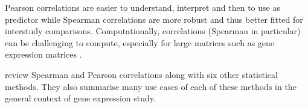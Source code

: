 Pearson correlations are easier to understand, interpret and then to use as predictor
while Spearman correlations are more robust and thus better fitted for interstudy
comparisons.
Computationally, correlations (Spearman in particular) can be challenging to compute,
especially for large matrices such as gene expression matrices .

\begin{comment}
Spearman correlations report on the strength and direction
of a monotonic relationship (specifically for ordinal data i.e.\ ranks)
between two variables.
It can also be used on interval or ratio data
even though Pearson correlation are usually better fitted to these kinds of data.
Pearson correlation measure the linear relationship between two variables
(interval scale) (true value).
\end{comment}

\cite{De_Siqueira_Santos2014-dp} review Spearman and Pearson correlations
along with six other statistical methods.
They also summarise many use cases of each of these methods
in the general context of gene expression study.

